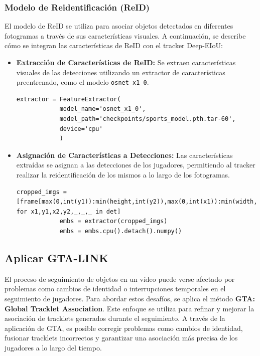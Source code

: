 \documentclass[12pt, a4paper, twoside]{article}
\begin{document}
	\subsubsection{Modelo de Reidentificación (ReID)}
	
	El modelo de ReID se utiliza para asociar objetos detectados en diferentes fotogramas a través de sus características visuales. A continuación, se describe cómo se integran las características de ReID con el tracker Deep-EIoU:
	
	\begin{itemize}
		\item \textbf{Extracción de Características de ReID:}  
		Se extraen características visuales de las detecciones utilizando un extractor de características preentrenado, como el modelo \texttt{osnet\_x1\_0}.
		\begin{lstlisting}[style=pythonstyle]
			extractor = FeatureExtractor(
			model_name='osnet_x1_0',
			model_path='checkpoints/sports_model.pth.tar-60',
			device='cpu'
			)
		\end{lstlisting}
		
		\item \textbf{Asignación de Características a Detecciones:}  
		Las características extraídas se asignan a las detecciones de los jugadores, permitiendo al tracker realizar la reidentificación de los mismos a lo largo de los fotogramas.
		\begin{lstlisting}[style=pythonstyle]
			cropped_imgs = [frame[max(0,int(y1)):min(height,int(y2)),max(0,int(x1)):min(width,int(x2))] for x1,y1,x2,y2,_,_,_ in det]
			embs = extractor(cropped_imgs)
			embs = embs.cpu().detach().numpy()
		\end{lstlisting}
	\end{itemize}
	
	
	
	\subsection{Aplicar GTA-LINK}
	
	El proceso de seguimiento de objetos en un vídeo puede verse afectado por problemas como cambios de identidad o interrupciones temporales en el seguimiento de jugadores. Para abordar estos desafíos, se aplica el método \textbf{GTA: Global Tracklet Association}. Este enfoque se utiliza para refinar y mejorar la asociación de tracklets generados durante el seguimiento. A través de la aplicación de GTA, es posible corregir problemas como cambios de identidad, fusionar tracklets incorrectos y garantizar una asociación más precisa de los jugadores a lo largo del tiempo.
	
\end{document}
